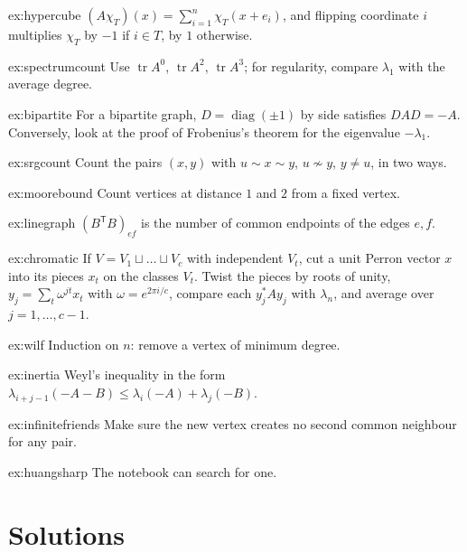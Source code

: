 \begin{hint}{ex:hypercube}
$(A\chi_T)(x)=\sum_{i=1}^n\chi_T(x+e_i)$, and flipping coordinate $i$ multiplies $\chi_T$ by $-1$ if $i\in T$, by $1$ otherwise.
\end{hint}
\begin{hint}{ex:spectrumcount}
Use $\operatorname{tr}A^0$, $\operatorname{tr}A^2$, $\operatorname{tr}A^3$; for regularity, compare $\lambda_1$ with the average degree.
\end{hint}
\begin{hint}{ex:bipartite}
For a bipartite graph, $D=\operatorname{diag}(\pm1)$ by side satisfies $DAD=-A$. Conversely, look at the proof of Frobenius's
theorem for the eigenvalue $-\lambda_1$.
\end{hint}
\begin{hint}{ex:srgcount}
Count the pairs $(x,y)$ with $u\sim x\sim y$, $u\not\sim y$, $y\ne u$, in two ways.
\end{hint}
\begin{hint}{ex:moorebound}
Count vertices at distance $1$ and $2$ from a fixed vertex.
\end{hint}
\begin{hint}{ex:linegraph}
$(B^{\mathsf T}B)_{ef}$ is the number of common endpoints of the edges $e,f$.
\end{hint}
\begin{hint}{ex:chromatic}
If $V=V_1\sqcup\dots\sqcup V_c$ with independent $V_t$, cut a unit Perron vector $x$ into its pieces $x_t$ on the classes $V_t$.
Twist the pieces by roots of unity, $y_j=\sum_t\omega^{jt}x_t$ with $\omega=e^{2\pi i/c}$, compare each $y_j^*Ay_j$ with $\lambda_n$,
and average over $j=1,\dots,c-1$.
\end{hint}
\begin{hint}{ex:wilf}
Induction on $n$: remove a vertex of minimum degree.
\end{hint}
\begin{hint}{ex:inertia}
Weyl's inequality in the form $\lambda_{i+j-1}(-A-B)\le\lambda_i(-A)+\lambda_j(-B)$.
\end{hint}
\begin{hint}{ex:infinitefriends}
Make sure the new vertex creates no second common neighbour for any pair.
\end{hint}
\begin{hint}{ex:huangsharp}
The notebook can search for one.
\end{hint}

\section{Solutions}

